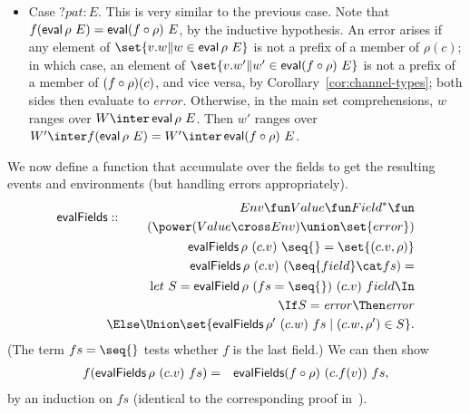 \begin{itemize}

\item Case $?pat:E$.  This is very similar to the previous case.
  Note that $f(\mathop{\sf eval} \rho~ E) = \mathop{\sf eval}(f\circ\rho)~ E$, by the inductive
  hypothesis.  
%
  An error arises if any element of $\set{v.w \| w \in \eval \rho~ E}$ is not
  a prefix of a member of $\rho(c)$; in which case, an element of $\set{v.w'
    \| w' \in \eval (f\after\rho)~ E}$ is not a prefix of a member of
  $(f\circ\rho)(c)$, and vice versa, by Corollary~\ref{cor:channel-types}; both
  sides then evaluate to $error$.
%
  Otherwise, in the main set comprehensions, $w$ ranges over $W \inter \eval
  \rho~ E$.  Then $w'$ ranges over $W' \inter f(\eval \rho~ E) = W' \inter
  \eval(f\after\rho)~ E$.
\end{itemize} %


We now define a function that accumulate over the fields to get the
resulting events and environments (but handling errors appropriately).
\[
\begin{align}
\evalFields :: 
  \begin{align}
  Env \fun  Value \fun Field^* \fun \\
  \qquad (\power (Value \cross Env) \union \set{error})
  \end{align} \\
\evalFields \rho~(c.v)~\seq{} = \set{(c.v,\rho)} \\
\evalFields \rho~(c.v)~(\seq{field} \cat fs)  = \\
\qquad
  \begin{align}
  \Let S = \evalField \rho~(fs=\seq{})~(c.v)~field \In \\
  \If S = \error \Then \error \\
  \Else \Union \set{ \evalFields \rho'~(c.w)~fs \mid  (c.w, \rho') \in S }.
  \end{align}
\end{align}
\]
(The term $fs=\seq{}$ tests whether $f$ is the last field.)
We can then show 
\begin{eqnarray*}%
f(\evalFields \rho~(c.v)~fs) & = & 
  \evalFields (f\after\rho)~(c.f(v))~fs ,
\end{eqnarray*}
%
by an induction on $fs$ (identical to the corresponding proof
in~\cite{symmetry-reduction}). 

